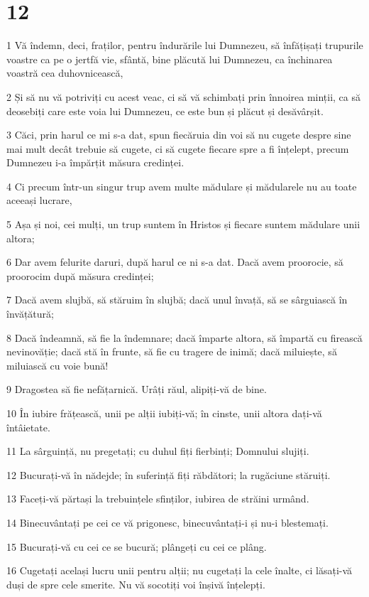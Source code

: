 \chapter{12}

\par 1 Vă îndemn, deci, fraților, pentru îndurările lui Dumnezeu, să înfățișați trupurile voastre ca pe o jertfă vie, sfântă, bine plăcută lui Dumnezeu, ca închinarea voastră cea duhovnicească,
\par 2 Și să nu vă potriviți cu acest veac, ci să vă schimbați prin înnoirea minții, ca să deosebiți care este voia lui Dumnezeu, ce este bun și plăcut și desăvârșit.
\par 3 Căci, prin harul ce mi s-a dat, spun fiecăruia din voi să nu cugete despre sine mai mult decât trebuie să cugete, ci să cugete fiecare spre a fi înțelept, precum Dumnezeu i-a împărțit măsura credinței.
\par 4 Ci precum într-un singur trup avem multe mădulare și mădularele nu au toate aceeași lucrare,
\par 5 Așa și noi, cei mulți, un trup suntem în Hristos și fiecare suntem mădulare unii altora;
\par 6 Dar avem felurite daruri, după harul ce ni s-a dat. Dacă avem proorocie, să proorocim după măsura credinței;
\par 7 Dacă avem slujbă, să stăruim în slujbă; dacă unul învață, să se sârguiască în învățătură;
\par 8 Dacă îndeamnă, să fie la îndemnare; dacă împarte altora, să împartă cu firească nevinovăție; dacă stă în frunte, să fie cu tragere de inimă; dacă miluiește, să miluiască cu voie bună!
\par 9 Dragostea să fie nefățarnică. Urâți răul, alipiți-vă de bine.
\par 10 În iubire frățească, unii pe alții iubiți-vă; în cinste, unii altora dați-vă întâietate.
\par 11 La sârguință, nu pregetați; cu duhul fiți fierbinți; Domnului slujiți.
\par 12 Bucurați-vă în nădejde; în suferință fiți răbdători; la rugăciune stăruiți.
\par 13 Faceți-vă părtași la trebuințele sfinților, iubirea de străini urmând.
\par 14 Binecuvântați pe cei ce vă prigonesc, binecuvântați-i și nu-i blestemați.
\par 15 Bucurați-vă cu cei ce se bucură; plângeți cu cei ce plâng.
\par 16 Cugetați același lucru unii pentru alții; nu cugetați la cele înalte, ci lăsați-vă duși de spre cele smerite. Nu vă socotiți voi înșivă înțelepți.
